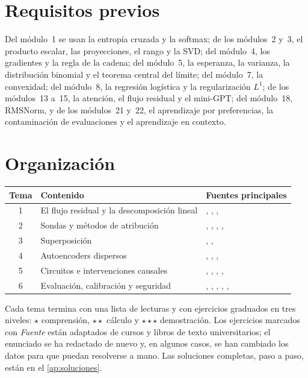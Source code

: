 \documentclass[11pt,a4paper,twoside,openany]{book}
\begin{document}
\section*{Requisitos previos}
Del módulo~1 se usan la entropía cruzada y la softmax; de los módulos~2 y~3, el producto escalar, las proyecciones, el rango y la SVD; del módulo~4, los gradientes y la regla de la cadena; del módulo~5, la esperanza, la varianza, la distribución binomial y el teorema central del límite; del módulo~7, la convexidad; del módulo~8, la regresión logística y la regularización $L^{1}$; de los módulos~13 a~15, la atención, el flujo residual y el mini-GPT; del módulo~18, RMSNorm, y de los módulos~21 y~22, el aprendizaje por preferencias, la contaminación de evaluaciones y el aprendizaje en contexto.

\section*{Organización}
\begin{center}\small
\begin{tabular}{@{}cll@{}}
\toprule
Tema & Contenido & Fuentes principales \\
\midrule
1 & El flujo residual y la descomposición lineal & \cite{elhage21}, \cite{nostalgebraist}, \cite{belrose}, \cite{jm3} \\
2 & Sondas y métodos de atribución & \cite{alain}, \cite{hewitt-liang}, \cite{hewitt-manning}, \cite{sundararajan}, \cite{lundberg} \\
3 & Superposición & \cite{elhage22}, \cite{bhk}, \cite{ball} \\
4 & Autoencoders dispersos & \cite{bricken}, \cite{templeton}, \cite{gemmascope}, \cite{d2l} \\
5 & Circuitos e intervenciones causales & \cite{olsson}, \cite{wang-ioi}, \cite{meng}, \cite{nanda}, \cite{turner} \\
6 & Evaluación, calibración y seguridad & \cite{hendrycks}, \cite{helm}, \cite{chen}, \cite{guo}, \cite{kalai25}, \cite{zou} \\
\bottomrule
\end{tabular}
\end{center}

Cada tema termina con una lista de lecturas y con ejercicios graduados en tres niveles: $\star$ comprensión, $\star\star$ cálculo y $\star\star\star$ demostración. Los ejercicios marcados con \emph{Fuente} están adaptados de cursos y libros de texto universitarios; el enunciado se ha redactado de nuevo y, en algunos casos, se han cambiado los datos para que puedan resolverse a mano. Las soluciones completas, paso a paso, están en el \cref{ap:soluciones}.
\end{document}
